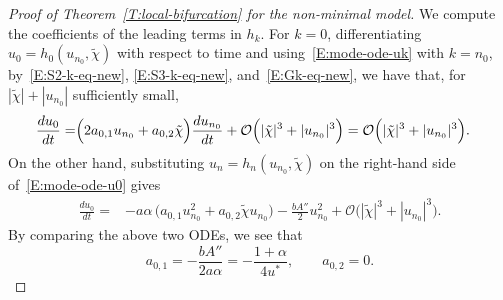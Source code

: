 \documentclass[11pt]{article} %
\theoremstyle{remark}
\theoremstyle{remark}
\numberwithin{equation}{section}
\numberwithin{figure}{section}
\numberwithin{table}{section}
\begin{document}
\begin{proof}[Proof of Theorem~\ref{T:local-bifurcation}  for the non-minimal model]
  We compute the coefficients of the leading terms in $h_k$. For $k = 0$,
  differentiating $u_0 = h_0(u_{n_0},\tilde{\chi})$ with respect to time and
  using~\eqref{E:mode-ode-uk} with $k = n_0$,
  by~\eqref{E:S2-k-eq-new}, \eqref{E:S3-k-eq-new}, and~\eqref{E:Gk-eq-new}, we
  have that, for $|\tilde{\chi}| + |u_{n_0}|$ sufficiently small,
  \begin{align}\label{E:du0-center}
    \frac{d u_0}{dt}
    = & \Big(2 a_{0,1} u_{n_0} + a_{0,2} \tilde{\chi}\Big)\frac{d u_{n_0}}{dt}
    + \mathcal{O}\Big(|\tilde{\chi}|^3 + |u_{n_0}|^3\Big) \notag =
    \mathcal{O}\Big(|\tilde{\chi}|^3 + |u_{n_0}|^3\Big).
  \end{align}
  On the other hand, substituting $u_n = h_n(u_{n_0}, \tilde{\chi})$ on the
  right-hand side of~\eqref{E:mode-ode-u0} gives
  \begin{align*}
    \frac{d u_0}{dt}
    = & -a\alpha\,\Big(a_{0,1} u_{n_0}^2 + a_{0,2} \tilde{\chi} u_{n_0}\Big)
    - \frac{bA''}{2} u_{n_0}^2
    + \mathcal{O}\Big(|\tilde{\chi}|^3 + |u_{n_0}|^3\Big).
  \end{align*}
  By comparing the above two ODEs, we see that
  \begin{equation}\label{E:a_0,i}
    {a_{0,1} = -\frac{bA''}{2a\alpha}=-\frac{1+\alpha}{4u^*}},
    \qquad
    a_{0,2}  = 0.
  \end{equation}


\end{proof}
\end{document}
